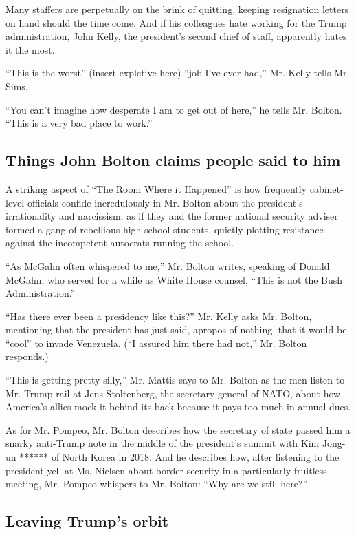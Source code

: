 Many staffers are perpetually on the brink of quitting, keeping
resignation letters on hand should the time come. And if his colleagues
hate working for the Trump administration, John Kelly, the president's
second chief of staff, apparently hates it the most.

``This is the worst'' (insert expletive here) ``job I've ever had,'' Mr.
Kelly tells Mr. Sims.

``You can't imagine how desperate I am to get out of here,'' he tells
Mr. Bolton. ``This is a very bad place to work.''

\hypertarget{things-john-bolton-claims-people-said-to-him}{%
\subsection{Things John Bolton claims people said to
him}\label{things-john-bolton-claims-people-said-to-him}}

A striking aspect of ``The Room Where it Happened'' is how frequently
cabinet-level officials confide incredulously in Mr. Bolton about the
president's irrationality and narcissism, as if they and the former
national security adviser formed a gang of rebellious high-school
students, quietly plotting resistance against the incompetent autocrats
running the school.

``As McGahn often whispered to me,'' Mr. Bolton writes, speaking of
Donald McGahn, who served for a while as White House counsel, ``This is
not the Bush Administration.''

``Has there ever been a presidency like this?'' Mr. Kelly asks Mr.
Bolton, mentioning that the president has just said, apropos of nothing,
that it would be ``cool'' to invade Venezuela. (``I assured him there
had not,'' Mr. Bolton responds.)

``This is getting pretty silly,'' Mr. Mattis says to Mr. Bolton as the
men listen to Mr. Trump rail at Jens Stoltenberg, the secretary general
of NATO, about how America's allies mock it behind its back because it
pays too much in annual dues.

As for Mr. Pompeo, Mr. Bolton describes how the secretary of state
passed him a snarky anti-Trump note in the middle of the president's
summit with Kim Jong-un ****** of North Korea in 2018. And he describes
how, after listening to the president yell at Ms. Nielsen about border
security in a particularly fruitless meeting, Mr. Pompeo whispers to Mr.
Bolton: ``Why are we still here?''

\hypertarget{leaving-trumps-orbit}{%
\subsection{Leaving Trump's orbit}\label{leaving-trumps-orbit}}

